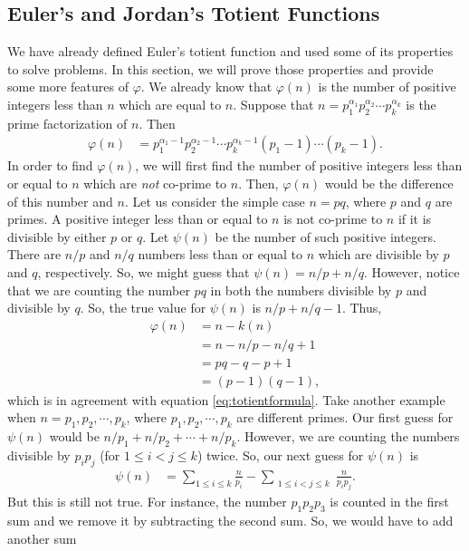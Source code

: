 \documentclass[12pt]{subfile}
\begin{document}
	
	\subsection{Euler's and Jordan's Totient Functions}
		We have already defined Euler's totient function and used some of its properties to solve problems. In this section, we will prove those properties and provide some more features of $\varphi$. We already know that $\varphi(n)$ is the number of positive integers less than $n$ which are equal to $n$. Suppose that $n= p_1^{\alpha_1} p_2^{\alpha_2} \cdots p_k^{\alpha_k}$ is the prime factorization of $n$. Then
			\begin{align}
				\varphi(n) & = p_1^{\alpha_1-1} p_2^{\alpha_2-1} \cdots p_k^{\alpha_k-1} \left( p_1 -1 \right) \cdots \left( p_k -1 \right). \label{eq:totientformula}
			\end{align}		
		In order to find $\varphi(n)$, we will first find the number of positive integers less than or equal to $n$ which are \textit{not} co-prime to $n$. Then, $\varphi(n)$ would be the difference of this number and $n$. Let us consider the simple case $n=pq$, where $p$ and $q$ are primes. A positive integer less than or equal to $n$ is not co-prime to $n$ if it is divisible by either $p$ or $q$. Let $\psi(n)$ be the number of such positive integers. There are $n/p$ and $n/q$ numbers less than or equal to $n$ which are divisible by $p$ and $q$, respectively. So, we might guess that $\psi(n)=n/p+n/q$. However, notice that we are counting the number $pq$ in both the numbers divisible by $p$ and divisible by $q$. So, the true value for $\psi(n)$ is $n/p+n/q-1$. Thus,
			\begin{align*}
				\varphi(n) &= n - k(n)\\
				&= n - n/p - n/q + 1\\
				&= pq - q - p +1\\
				&= (p-1)(q-1),
			\end{align*}
		which is in agreement with equation \eqref{eq:totientformula}. Take another example when $n=p_1,p_2,\cdots,p_k$, where $p_1,p_2,\cdots,p_k$ are different primes. Our first guess for $\psi(n)$ would be $n/p_1 +‌n/p_2 + \cdots + n/p_k$. However, we are counting the numbers divisible by $p_ip_j$ (for $1\leq i <j \leq k$) twice. So, our next guess for $\psi(n)$ is
			\begin{align*}
				\psi(n) &= \sum_{1 \leq i \leq k} \frac{n}{p_i} - \sum_{\substack{1 \leq i < j\leq k }} \frac{n}{p_ip_j}.
			\end{align*}
		But this is still not true. For instance, the number $p_1p_2p_3$ is counted in the first sum and we remove it by subtracting the second sum. So, we would have to add another sum
\end{document}
